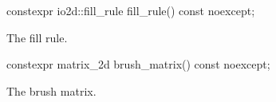%
\begin{itemdecl}
constexpr io2d::fill_rule fill_rule() const noexcept;
\end{itemdecl}
\begin{itemdescr}
\pnum
\returns
The fill rule.
\end{itemdescr}

%
\begin{itemdecl}
constexpr matrix_2d brush_matrix() const noexcept;
\end{itemdecl}
\begin{itemdescr}
\pnum
\returns
The brush matrix.
\end{itemdescr}
